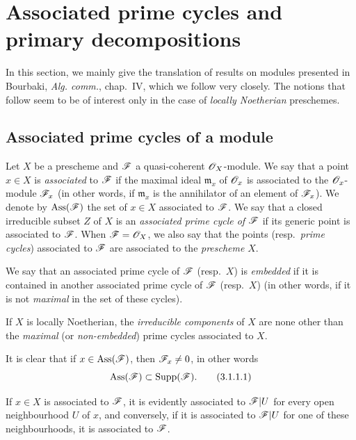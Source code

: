 \section{Associated prime cycles and primary decompositions}
\label{section:IV.3}


In this section, we mainly give the translation of results on modules presented in Bourbaki, \emph{Alg. comm.}, chap.~IV, which we follow very closely.
The notions that follow seem to be of interest only in the case of \emph{locally Noetherian} preschemes.

\subsection{Associated prime cycles of a module}
\label{subsection:IV.3.1}

\begin{definition}[3.1.1]
\label{IV.3.1.1}
Let $X$ be a prescheme and $\mathscr{F}$ a quasi-coherent $\mathscr{O}_X$-module.
We say that a point $x\in X$ is \emph{associated} to $\mathscr{F}$ if the maximal ideal $\mathfrak{m}_x$ of $\mathscr{O}_x$ is associated to the $\mathscr{O}_x$-module $\mathscr{F}_x$ (in other words, if $\mathfrak{m}_x$ is the annihilator of an element of $\mathscr{F}_x$).
We denote by $\operatorname{Ass}(\mathscr{F})$ the set of $x\in X$ associated to $\mathscr{F}$.
We say that a closed irreducible subset $Z$ of $X$ is an \emph{associated prime cycle of $\mathscr{F}$} if its generic point is associated to $\mathscr{F}$.
When $\mathscr{F}=\mathscr{O}_X$, we also say that the points (resp.\ \emph{prime cycles}) associated to $\mathscr{F}$ are associated to the \emph{prescheme} $X$.
\end{definition}

We say that an associated prime cycle of $\mathscr{F}$ (resp.\ $X$) is \emph{embedded} if it is contained in another associated prime cycle of $\mathscr{F}$ (resp.\ $X$) (in other words, if it is not \emph{maximal} in the set of these cycles).

If $X$ is locally Noetherian, the \emph{irreducible components} of $X$ are none other than the \emph{maximal} (or \emph{non-embedded}) prime cycles associated to $X$.

It is clear that if $x\in\operatorname{Ass}(\mathscr{F})$, then $\mathscr{F}_x\neq 0$, in other words
\[
\label{IV.3.1.1.1}
\operatorname{Ass}(\mathscr{F})\subset\operatorname{Supp}(\mathscr{F}).
\tag{3.1.1.1}
\]

If $x\in X$ is associated to $\mathscr{F}$, it is evidently associated to $\mathscr{F}|U$ for every open neighbourhood $U$ of $x$, and conversely, if it is associated to $\mathscr{F}|U$ for one of these neighbourhoods, it is associated to $\mathscr{F}$.

